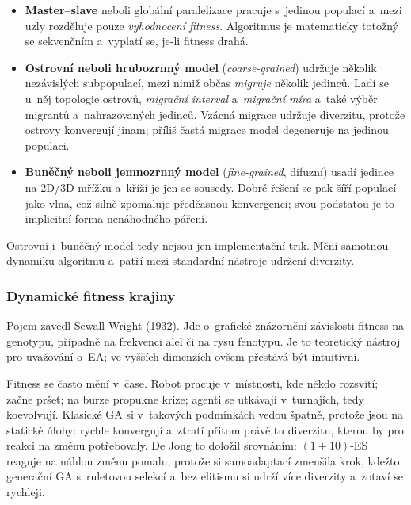 \documentclass[11pt,a4paper]{article}
\theoremstyle{definition}
\begin{document}
\begin{itemize}
\item \textbf{Master--slave} neboli globální paralelizace pracuje s~jedinou populací a~mezi
  uzly rozděluje pouze \emph{vyhodnocení fitness}. Algoritmus je matematicky totožný se
  sekvenčním a~vyplatí se, je-li fitness drahá.
\item \textbf{Ostrovní neboli hrubozrnný model} (\emph{coarse-grained}) udržuje několik
  nezávislých subpopulací, mezi nimiž občas \emph{migruje} několik jedinců. Ladí se u~něj
  topologie ostrovů, \emph{migrační interval} a~\emph{migrační míra} a~také výběr migrantů
  a~nahrazovaných jedinců. Vzácná migrace udržuje diverzitu, protože ostrovy konvergují
  jinam; příliš častá migrace model degeneruje na jedinou populaci.
\item \textbf{Buněčný neboli jemnozrnný model} (\emph{fine-grained}, difuzní) usadí jedince
  na 2D/3D mřížku a~kříží je jen se sousedy. Dobré řešení se pak šíří populací jako vlna,
  což silně zpomaluje předčasnou konvergenci; svou podstatou je to implicitní forma
  nenáhodného páření.
\end{itemize}
Ostrovní i~buněčný model tedy nejsou jen implementační trik. Mění samotnou dynamiku
algoritmu a~patří mezi standardní nástroje udržení diverzity.

\subsubsection{Dynamické fitness krajiny}

\begin{defbox}
Pojem zavedl Sewall Wright (1932). Jde o~grafické znázornění závislosti fitness na genotypu,
případně na frekvenci alel či na rysu fenotypu. Je to teoretický nástroj pro uvažování o~EA;
ve vyšších dimenzích ovšem přestává být intuitivní.
\end{defbox}

Fitness se často mění v~čase. Robot pracuje v~místnosti, kde někdo rozsvítí; začne pršet;
na burze propukne krize; agenti se utkávají v~turnajích, tedy koevolvují. Klasické GA si
v~takových podmínkách vedou špatně, protože jsou  na statické úlohy: rychle
konvergují a~ztratí přitom právě tu diverzitu, kterou by pro reakci na změnu potřebovaly.
De Jong to doložil srovnáním: $(1+10)$-ES reaguje na náhlou změnu pomalu, protože si
samoadaptací zmenšila krok, kdežto generační GA s~ruletovou selekcí a~bez elitismu si udrží
více diverzity a~zotaví se rychleji.
\end{document}
